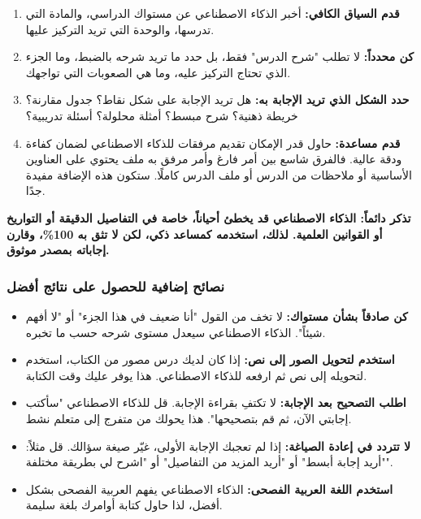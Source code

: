 \documentclass[12pt,a4paper]{book}
\newcommand{\importantAr}[1]{%
	\begin{important}
		\bfseries #1
	\end{important}
}
\begin{document}
\begin{enumerate}
	\item \textbf{قدم السياق الكافي:} أخبر الذكاء الاصطناعي عن مستواك الدراسي، والمادة التي تدرسها، والوحدة التي تريد التركيز عليها.
	\item \textbf{كن محدداً:} لا تطلب "شرح الدرس" فقط، بل حدد ما تريد شرحه بالضبط، وما الجزء الذي تحتاج التركيز عليه، وما هي الصعوبات التي تواجهك.
	\item \textbf{حدد الشكل الذي تريد الإجابة به:} هل تريد الإجابة على شكل نقاط؟ جدول مقارنة؟ خريطة ذهنية؟ شرح مبسط؟ أمثلة محلولة؟ أسئلة تدريبية؟
	\item \textbf{قدم مساعدة:} حاول قدر الإمكان تقديم مرفقات للذكاء الاصطناعي لضمان كفاءة ودقة عالية. فالفرق شاسع بين أمر فارغ وأمر مرفق به ملف يحتوي على العناوين الأساسية أو ملاحظات من الدرس أو ملف الدرس كاملًا. ستكون هذه الإضافة مفيدة جدًا.
\end{enumerate}

\importantAr{تذكر دائماً: الذكاء الاصطناعي قد يخطئ أحياناً، خاصة في التفاصيل الدقيقة أو التواريخ أو القوانين العلمية. لذلك، استخدمه كمساعد ذكي، لكن لا تثق به 100\%، وقارن إجاباته بمصدر موثوق.}


\subsubsection{نصائح إضافية للحصول على نتائج أفضل}

\begin{itemize}
	\item \textbf{كن صادقاً بشأن مستواك:} لا تخف من القول "أنا ضعيف في هذا الجزء" أو "لا أفهم شيئاً". الذكاء الاصطناعي سيعدل مستوى شرحه حسب ما تخبره.
	\item \textbf{استخدم  لتحويل الصور إلى نص:} إذا كان لديك درس مصور من الكتاب، استخدم  لتحويله إلى نص ثم ارفعه للذكاء الاصطناعي. هذا يوفر عليك وقت الكتابة.
	\item \textbf{اطلب التصحيح بعد الإجابة:} لا تكتفِ بقراءة الإجابة. قل للذكاء الاصطناعي "سأكتب إجابتي الآن، ثم قم بتصحيحها". هذا يحولك من متفرج إلى متعلم نشط.
	\item \textbf{لا تتردد في إعادة الصياغة:} إذا لم تعجبك الإجابة الأولى، غيّر صيغة سؤالك. قل مثلاً: "أريد إجابة أبسط" أو "أريد المزيد من التفاصيل" أو "اشرح لي بطريقة مختلفة".
	\item \textbf{استخدم اللغة العربية الفصحى:} الذكاء الاصطناعي يفهم العربية الفصحى بشكل أفضل، لذا حاول كتابة أوامرك بلغة سليمة.
\end{itemize}
\end{document}
